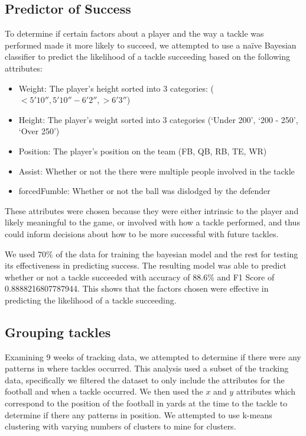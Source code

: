 \documentclass[bibtex, sigconf, hyperref={colorlinks=true,linkcolor=blue,urlcolor=blue}]{acmart}
\begin{document}
\subsection{Predictor of Success}
To determine if certain factors about a player and the way a tackle was
performed made it more likely to succeed, we attempted to use a na\"ive
Bayesian classifier to predict the likelihood of a tackle succeeding based on
the following attributes:
\begin{itemize}
\item Weight: The player's height sorted into 3 categories: ($< 5'10'', 5'10''-6'2'', > 6'3''$)
\item Height: The player's weight sorted into 3 categories (`Under 200', `200 - 250', `Over 250')
\item Position: The player's position on the team (FB, QB, RB, TE, WR)
\item Assist: Whether or not the there were multiple people involved in the tackle
\item forcedFumble: Whether or not the ball was dislodged by the defender
\end{itemize}
These attributes were chosen because they were either intrinsic to the player
and likely meaningful to the game, or involved with how a tackle performed,
and thus could inform decisions about how to be more successful with future
tackles.

We used $70\%$ of the data for training the bayesian model and the rest for
testing its effectiveness in predicting success. The resulting model was able to
predict whether or not a tackle succeeded with accuracy of 88.6\% and F1 Score
of 0.8888216807787944. This shows that the factors chosen were effective in
predicting the likelihood of a tackle succeeding.

\subsection{Grouping tackles}
Examining 9 weeks of tracking data, we attempted to determine if there were any
patterns in where tackles occurred. This analysis used a subset of the tracking
data, specifically we filtered the dataset to only include the attributes for
the football and when a tackle occurred. We then used the $x$ and $y$ attributes
which correspond to the position of the football in yards at the time to the
tackle to determine if there any patterns in position. We attempted to use
k-means clustering with varying numbers of clusters to mine for clusters.
\end{document}
